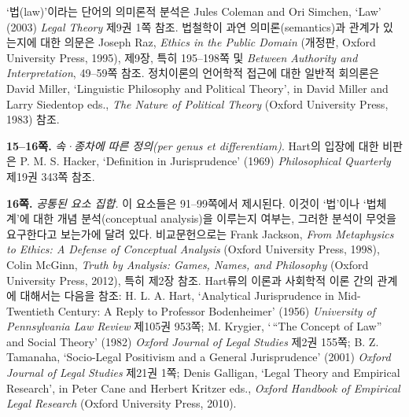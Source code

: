 \documentclass[12pt, oneside]{book}  %
\begin{document}
`법(law)'이라는 단어의 의미론적 분석은 Jules Coleman and Ori Simchen,
`Law' (2003) \emph{Legal Theory} 제9권 1쪽 참조. 법철학이 과연
의미론(semantics)과 관계가 있는지에 대한 의문은 Joseph Raz, \emph{Ethics
in the Public Domain} (개정판, Oxford University Press, 1995), 제9장,
특히 195--198쪽 및 \emph{Between Authority and Interpretation}, 49--59쪽
참조. 정치이론의 언어학적 접근에 대한 일반적 회의론은 David Miller,
`Linguistic Philosophy and Political Theory', in David Miller and Larry
Siedentop eds., \emph{The Nature of Political Theory} (Oxford University
Press, 1983) 참조.

\textbf{15--16쪽.} \emph{속·종차에 따른 정의(per genus et
differentiam)}. Hart의 입장에 대한 비판은 P. M. S. Hacker, `Definition
in Jurisprudence' (1969) \emph{Philosophical Quarterly} 제19권 343쪽
참조.

\textbf{16쪽.} \emph{공통된 요소 집합.} 이 요소들은 91--99쪽에서
제시된다. 이것이 `법'이나 `법체계'에 대한 개념 분석(conceptual
analysis)을 이루는지 여부는, 그러한 분석이 무엇을 요구한다고 보는가에
달려 있다. 비교문헌으로는 Frank Jackson, \emph{From Metaphysics to
Ethics: A Defense of Conceptual Analysis} (Oxford University Press,
1998), Colin McGinn, \emph{Truth by Analysis: Games, Names, and
Philosophy} (Oxford University Press, 2012), 특히 제2장 참조. Hart류의
이론과 사회학적 이론 간의 관계에 대해서는 다음을 참조: H. L. A. Hart,
`Analytical Jurisprudence in Mid-Twentieth Century: A Reply to Professor
Bodenheimer' (1956) \emph{University of Pennsylvania Law Review} 제105권
953쪽; M. Krygier, `\,``The Concept of Law'' and Social Theory' (1982)
\emph{Oxford Journal of Legal Studies} 제2권 155쪽; B. Z. Tamanaha,
`Socio-Legal Positivism and a General Jurisprudence' (2001) \emph{Oxford
Journal of Legal Studies} 제21권 1쪽; Denis Galligan, `Legal Theory and
Empirical Research', in Peter Cane and Herbert Kritzer eds.,
\emph{Oxford Handbook of Empirical Legal Research} (Oxford University
Press, 2010).
\end{document}
